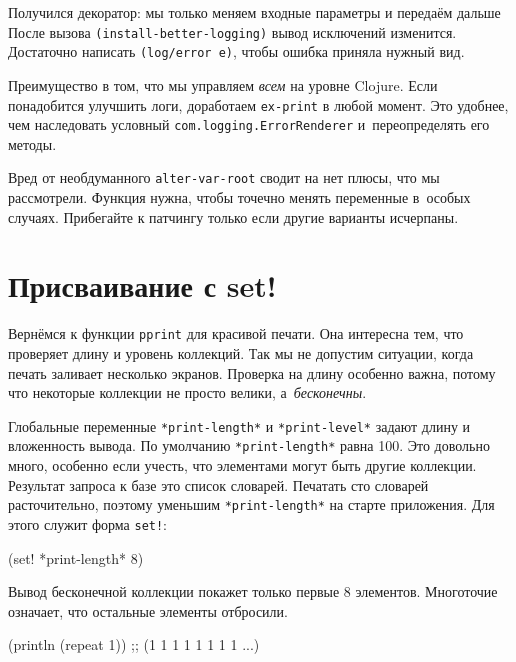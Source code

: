 Получился декоратор: мы только меняем входные параметры и передаём дальше После
вызова \verb|(install-better-logging)| вывод исключений изменится. Достаточно
написать \verb|(log/error e)|, чтобы ошибка приняла нужный вид.

Преимущество в том, что мы управляем \emph{всем} на уровне Clojure. Если
понадобится улучшить логи, доработаем \verb|ex-print| в любой момент. Это
удобнее, чем наследовать условный \verb|com.logging.ErrorRenderer|
и~переопределять его методы.

Вред от необдуманного \verb|alter-var-root| сводит на нет плюсы, что мы
рассмотрели. Функция нужна, чтобы точечно менять переменные в~особых
случаях. Прибегайте к патчингу только если другие варианты исчерпаны.

\section{Присваивание с set!}


Вернёмся к функции \verb|pprint| для красивой печати. Она интересна тем, что
проверяет длину и уровень коллекций. Так мы не допустим ситуации, когда печать
заливает несколько экранов. Проверка на длину особенно важна, потому что
некоторые коллекции не просто велики, а~\emph{бесконечны}.


Глобальные переменные \verb|*print-length*| и \verb|*print-level*| задают длину
и вложенность вывода. По умолчанию \verb|*print-length*| равна 100. Это довольно
много, особенно если учесть, что элементами могут быть другие
коллекции. Результат запроса к базе это список словарей. Печатать сто словарей
расточительно, поэтому уменьшим \verb|*print-length*| на старте приложения. Для
этого служит форма \verb|set!|:

\begin{english}
  \begin{clojure}
(set! *print-length* 8)
  \end{clojure}
\end{english}

\noindent
Вывод бесконечной коллекции покажет только первые 8 элементов. Многоточие
означает, что остальные элементы отбросили.

\begin{english}
  \begin{clojure}
(println (repeat 1))
;; (1 1 1 1 1 1 1 1 ...)
  \end{clojure}
\end{english}

